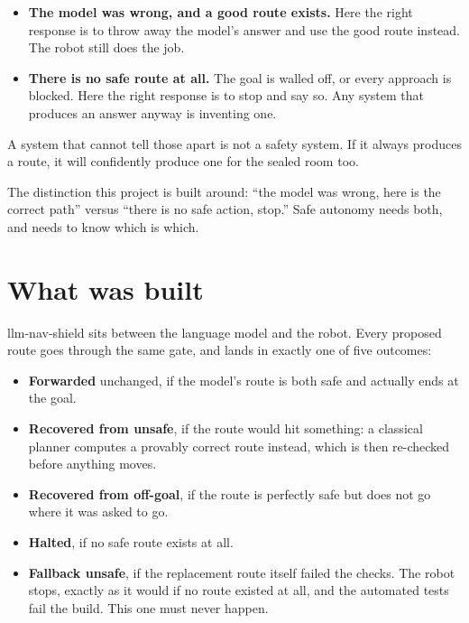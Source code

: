 \documentclass[11pt,a4paper]{article}
\begin{document}
\begin{itemize}[leftmargin=1.4em,itemsep=2pt]
\item \textbf{The model was wrong, and a good route exists.} Here the right response is to throw away the model's answer and use the good route instead. The robot still does the job.
\item \textbf{There is no safe route at all.} The goal is walled off, or every approach is blocked. Here the right response is to stop and say so. Any system that produces an answer anyway is inventing one.
\end{itemize}

A system that cannot tell those apart is not a safety system. If it always produces a route, it will confidently produce one for the sealed room too.

\begin{quotebox}
The distinction this project is built around: ``the model was wrong, here is the correct path'' versus ``there is no safe action, stop.'' Safe autonomy needs both, and needs to know which is which.
\end{quotebox}

\section{What was built}

llm-nav-shield sits between the language model and the robot. Every proposed route goes through the same gate, and lands in exactly one of five outcomes:

\begin{itemize}[leftmargin=1.4em,itemsep=2pt]
\item \textbf{Forwarded} unchanged, if the model's route is both safe and actually ends at the goal.
\item \textbf{Recovered from unsafe}, if the route would hit something: a classical planner computes a provably correct route instead, which is then re-checked before anything moves.
\item \textbf{Recovered from off-goal}, if the route is perfectly safe but does not go where it was asked to go.
\item \textbf{Halted}, if no safe route exists at all.
\item \textbf{Fallback unsafe}, if the replacement route itself failed the checks. The robot stops, exactly as it would if no route existed at all, and the automated tests fail the build. This one must never happen.
\end{itemize}
\end{document}
